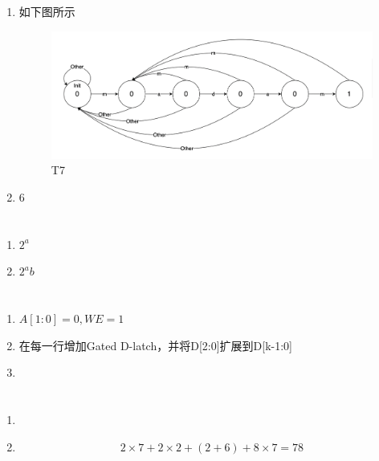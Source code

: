 \documentclass[UTF8]{ctexart}
\begin{document}
\section{}  %
\begin{enumerate}
  \item 如下图所示
  \begin{figure}[h]
    \centering
    \includegraphics[scale=0.3]{p5.png}
    \caption{T7}
  \end{figure}
  \item 6
\end{enumerate}
\section{}  %
\begin{enumerate}
  \item $2^a$
  \item $2^ab$
\end{enumerate}
\section{}  %
\begin{enumerate}
  \item $A[1:0]=0, WE=1$
  \item 在每一行增加Gated D-latch，并将D[2:0]扩展到D[k-1:0]
  \item 
\end{enumerate}
\section{}  %
\begin{enumerate}
  \item 
  \item $$2\times 7 + 2\times 2 + \left(2 + 6\right) + 8\times 7 = 78$$ 
\end{enumerate}

\end{document}
